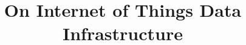 \documentclass[journal]{IEEEtran}
\begin{document}
%
\title{On Internet of Things Data Infrastructure}
%
%
%


% 
%
\end{document}
